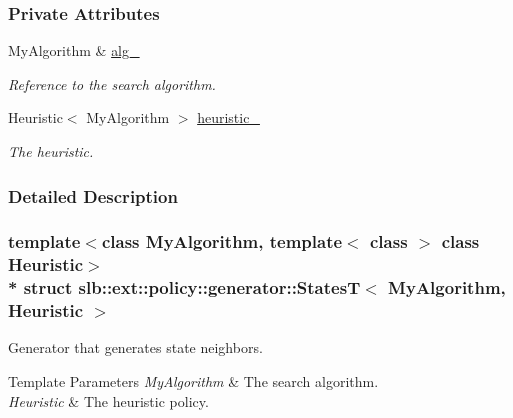 \subsubsection*{Private Attributes}
\begin{DoxyCompactItemize}
\item 
My\+Algorithm \& \hyperlink{structslb_1_1ext_1_1policy_1_1generator_1_1StatesT_adffaa6961b9ecda8235c00eca1f62ad3}{alg\+\_\+}\hypertarget{structslb_1_1ext_1_1policy_1_1generator_1_1StatesT_adffaa6961b9ecda8235c00eca1f62ad3}{}\label{structslb_1_1ext_1_1policy_1_1generator_1_1StatesT_adffaa6961b9ecda8235c00eca1f62ad3}

\begin{DoxyCompactList}\small\item\em Reference to the search algorithm. \end{DoxyCompactList}\item 
Heuristic$<$ My\+Algorithm $>$ \hyperlink{structslb_1_1ext_1_1policy_1_1generator_1_1StatesT_a5bd47a947af48d88c30e542df606043e}{heuristic\+\_\+}\hypertarget{structslb_1_1ext_1_1policy_1_1generator_1_1StatesT_a5bd47a947af48d88c30e542df606043e}{}\label{structslb_1_1ext_1_1policy_1_1generator_1_1StatesT_a5bd47a947af48d88c30e542df606043e}

\begin{DoxyCompactList}\small\item\em The heuristic. \end{DoxyCompactList}\end{DoxyCompactItemize}


\subsubsection{Detailed Description}
\subsubsection*{template$<$class My\+Algorithm, template$<$ class $>$ class Heuristic$>$\\*
struct slb\+::ext\+::policy\+::generator\+::\+States\+T$<$ My\+Algorithm, Heuristic $>$}

Generator that generates state neighbors. 


\begin{DoxyTemplParams}{Template Parameters}
{\em My\+Algorithm} & The search algorithm. \\
\hline
{\em Heuristic} & The heuristic policy. \\
\hline
\end{DoxyTemplParams}


